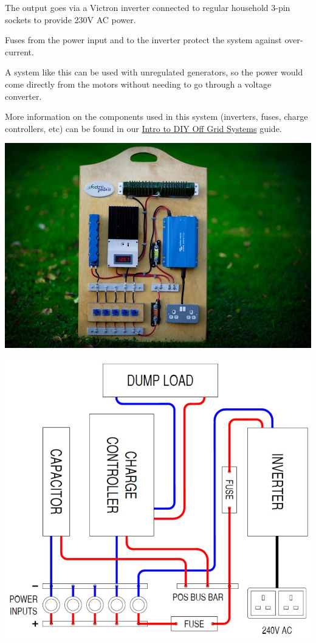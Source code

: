 \documentclass{article}
\theoremstyle{definition}
\theoremstyle{definition}
\theoremstyle{remark}
\begin{document}
    The output goes via a Victron inverter connected to regular household 3-pin sockets to provide 230V AC power. 

    Fuses from the power input and to the inverter protect the system against over-current.

    A system like this can be used with unregulated generators, so the power would come directly from the motors without needing to go through a voltage converter. 

    More information on the components used in this system (inverters, fuses, charge controllers, etc) can be found in our \href{https://www.demandenergyequality.org/get-started-with-offgrid}{Intro to DIY Off Grid Systems} guide.
    
    \begin{center}
      \includegraphics[width=0.35\paperwidth]{../Images/image_5_4_(example_board).png}
    \end{center}

    \begin{center}
      \includegraphics[width=0.35\paperwidth]{Images/image_5_5_(example_diagram).png}
    \end{center}
\end{document}
